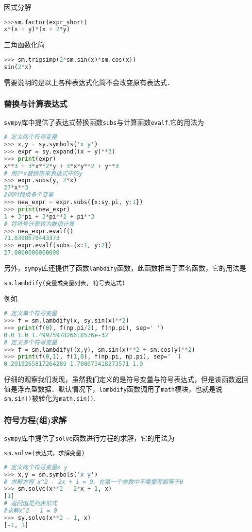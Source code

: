 因式分解
\begin{lstlisting}[language=python]
>>>sm.factor(expr_short) 
x*(x + y)*(x + 2*y)

\end{lstlisting}

三角函数化简
\begin{lstlisting}[language=python]
>>> sm.trigsimp(2*sm.sin(x)*sm.cos(x))
sin(2*x)
\end{lstlisting}
需要说明的是以上各种表达式化简不会改变原有表达式．

\subsubsection{替换与计算表达式}
\verb|sympy|库中提供了表达式替换函数\verb|subs|与计算函数\verb|evalf|,它的用法为
\begin{lstlisting}[language=python]
# 定义两个符号变量
>>> x,y = sy.symbols('x y')
>>> expr = sy.expand((x + y)**3)
>>> print(expr)
x**3 + 3*x**2*y + 3*x*y**2 + y**3
# 用2*x替换原来表达式中的y
>>> expr.subs(y, 2*x)
27*x**3
#同时替换多个变量
>>> new_expr = expr.subs({x:sy.pi, y:1})
>>> print(new_expr)
1 + 3*pi + 3*pi**2 + pi**3
# 将符号计算转为数值计算
>>> new_expr.evalf() 
71.0398678443373
>>> expr.evalf(subs={x:1, y:2})
27.0000000000000
\end{lstlisting}
另外，\verb|sympy|库还提供了函数\verb|lambdify|函数，此函数相当于匿名函数，它的用法是
\begin{lstlisting}[language=python]
 sm.lambdify(变量或变量列表, 符号表达式)
\end{lstlisting}
例如
\begin{lstlisting}[language=python]
# 定义单个符号变量
>>> f = sm.lambdify(x, sy.sin(x)**2)
>>> print(f(0), f(np.pi/2), f(np.pi), sep=' ')
0.0 1.0 1.4997597826618576e-32
# 定义多个符号变量
>>> f = sm.lambdify((x,y), sm.sin(x)**2 + sm.cos(y)**2)
>>> print(f(0,1), f(1,0), f(np.pi, np.pi), sep=' ')
0.2919265817264289 1.708073418273571 1.0
\end{lstlisting}
仔细的观察我们发现，虽然我们定义的是符号变量与符号表达式，但是该函数返回值是浮点型数据．默认情况下，\verb|lambdify|函数调用了\verb|math|模块，也就是说\verb|sm.sin()|被转化为\verb|math.sin()|.

\subsubsection{符号方程(组)求解}
\verb|sympy|库中提供了\verb|solve|函数进行方程的求解，它的用法为
\begin{lstlisting}[language=python]
sm.solve(表达式，求解变量)
\end{lstlisting}

\begin{lstlisting}[language=python]
# 定义两个符号变量x y
>>> x,y = sm.symbols('x y')
# 求解方程 x^2 - 2x + 1 = 0，在第一个参数中不需要写都等于0
>>> sm.solve(x**2 - 2*x + 1, x)
[1] 
# 返回值是列表形式
#求解x^2 - 1 = 0
>>> sy.solve(x**2 - 1, x)
[-1, 1]

\end{lstlisting}
